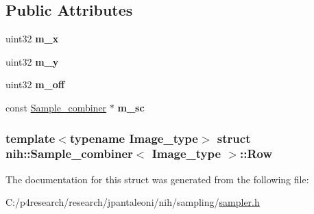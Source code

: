 \subsection*{\-Public \-Attributes}
\begin{DoxyCompactItemize}
\item 
\hypertarget{structnih_1_1_sample__combiner_1_1_row_af47b87dfa5d2497d0f85f780971d2096}{
uint32 {\bfseries m\-\_\-x}}
\label{structnih_1_1_sample__combiner_1_1_row_af47b87dfa5d2497d0f85f780971d2096}

\item 
\hypertarget{structnih_1_1_sample__combiner_1_1_row_a0e99bea2fb0a1157470a7e4399193e81}{
uint32 {\bfseries m\-\_\-y}}
\label{structnih_1_1_sample__combiner_1_1_row_a0e99bea2fb0a1157470a7e4399193e81}

\item 
\hypertarget{structnih_1_1_sample__combiner_1_1_row_a15a9e879d7d74434e06d8eefee6d6c41}{
uint32 {\bfseries m\-\_\-off}}
\label{structnih_1_1_sample__combiner_1_1_row_a15a9e879d7d74434e06d8eefee6d6c41}

\item 
\hypertarget{structnih_1_1_sample__combiner_1_1_row_aa74549e18bc1763c29759b65fcda9525}{
const \hyperlink{classnih_1_1_sample__combiner}{\-Sample\-\_\-combiner} $\ast$ {\bfseries m\-\_\-sc}}
\label{structnih_1_1_sample__combiner_1_1_row_aa74549e18bc1763c29759b65fcda9525}

\end{DoxyCompactItemize}
\subsubsection*{template$<$typename Image\-\_\-type$>$ struct nih\-::\-Sample\-\_\-combiner$<$ Image\-\_\-type $>$\-::\-Row}



\-The documentation for this struct was generated from the following file\-:\begin{DoxyCompactItemize}
\item 
\-C\-:/p4research/research/jpantaleoni/nih/sampling/\hyperlink{sampler_8h}{sampler.\-h}\end{DoxyCompactItemize}
